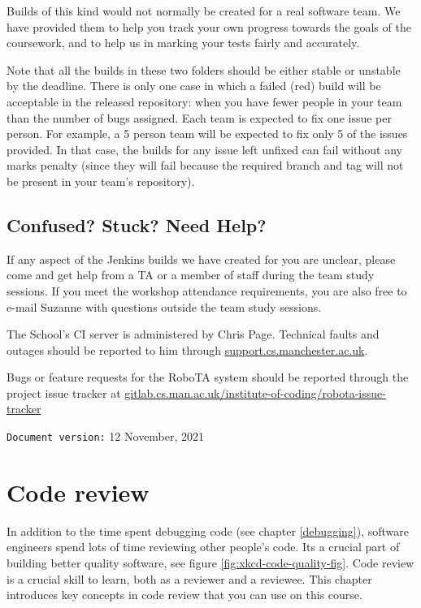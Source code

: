 \documentclass[
]{book}
\begin{document}
Builds of this kind would not normally be created for a real software team. We have provided them to help you track your own progress towards the goals of the coursework, and to help us in marking your tests fairly and accurately.

Note that all the builds in these two folders should be either stable or unstable by the deadline. There is only one case in which a failed (red) build will be acceptable in the released repository: when you have fewer people in your team than the number of bugs assigned. Each team is expected to fix one issue per person. For example, a 5 person team will be expected to fix only 5 of the issues provided. In that case, the builds for any issue left unfixed can fail without any marks penalty (since they will fail because the required branch and tag will not be present in your team's repository).

\hypertarget{confused}{%
\section{Confused? Stuck? Need Help?}\label{confused}}

If any aspect of the Jenkins builds we have created for you are unclear, please come and get help from a TA or a member of staff during the team study sessions. If you meet the workshop attendance requirements, you are also free to e-mail Suzanne with questions outside the team study sessions.

The School's CI server is administered by Chris Page. Technical faults and outages should be reported to him through \href{https://support.cs.manchester.ac.uk}{support.cs.manchester.ac.uk}.

Bugs or feature requests for the RoboTA system should be reported through the project issue tracker at \href{https://gitlab.cs.man.ac.uk/institute-of-coding/robota-issue-tracker}{gitlab.cs.man.ac.uk/institute-of-coding/robota-issue-tracker}

\texttt{Document\ version:} 12 November, 2021

\hypertarget{reviewing}{%
\chapter{Code review}\label{reviewing}}

In addition to the time spent debugging code (see chapter \ref{debugging}), software engineers spend lots of time reviewing other people's code. Its a crucial part of building better quality software, see figure \ref{fig:xkcd-code-quality-fig}. Code review is a crucial skill to learn, both as a reviewer and a reviewee. This chapter introduces key concepts in code review that you can use on this course.
\end{document}
